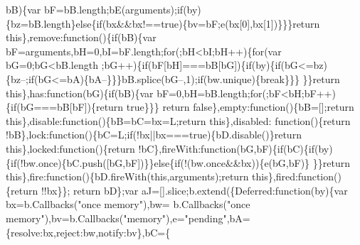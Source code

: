 \begin{DoxyCode}
      bB)\{var bF=bB.length;bE(arguments);\textcolor{keywordflow}{if}(by)\{bz=bB.length\}\textcolor{keywordflow}{else}\{\textcolor{keywordflow}{if}(bx&&bx!==\textcolor{keyword}{true})\{bv=bF;e(bx[0],bx[1])\}\}\}\textcolor{keywordflow}{return} \textcolor{keyword}{
      this}\},\textcolor{keyword}{remove}:\textcolor{keyword}{function}()\{\textcolor{keywordflow}{if}(bB)\{var bF=arguments,bH=0,bI=bF.length;\textcolor{keywordflow}{for}(;bH<bI;bH++)\{\textcolor{keywordflow}{for}(var bG=0;bG<bB.length
      ;bG++)\{\textcolor{keywordflow}{if}(bF[bH]===bB[bG])\{\textcolor{keywordflow}{if}(by)\{\textcolor{keywordflow}{if}(bG<=bz)\{bz--;\textcolor{keywordflow}{if}(bG<=bA)\{bA--\}\}\}bB.splice(bG--,1);\textcolor{keywordflow}{if}(bw.unique)\{\textcolor{keywordflow}{break}\}\}\}
      \}\}\textcolor{keywordflow}{return} \textcolor{keyword}{this}\},has:\textcolor{keyword}{function}(bG)\{\textcolor{keywordflow}{if}(bB)\{var bF=0,bH=bB.length;\textcolor{keywordflow}{for}(;bF<bH;bF++)\{\textcolor{keywordflow}{if}(bG===bB[bF])\{\textcolor{keywordflow}{return} \textcolor{keyword}{true}\}\}\}\textcolor{keywordflow}{
      return} \textcolor{keyword}{false}\},empty:\textcolor{keyword}{function}()\{bB=[];\textcolor{keywordflow}{return} \textcolor{keyword}{this}\},disable:\textcolor{keyword}{function}()\{bB=bC=bx=L;\textcolor{keywordflow}{return} \textcolor{keyword}{this}\},disabled:\textcolor{keyword}{
      function}()\{\textcolor{keywordflow}{return} !bB\},lock:\textcolor{keyword}{function}()\{bC=L;\textcolor{keywordflow}{if}(!bx||bx===\textcolor{keyword}{true})\{bD.disable()\}\textcolor{keywordflow}{return} \textcolor{keyword}{this}\},locked:\textcolor{keyword}{function}()\{\textcolor{keywordflow}{return} 
      !bC\},fireWith:\textcolor{keyword}{function}(bG,bF)\{\textcolor{keywordflow}{if}(bC)\{\textcolor{keywordflow}{if}(by)\{\textcolor{keywordflow}{if}(!bw.once)\{bC.push([bG,bF])\}\}\textcolor{keywordflow}{else}\{\textcolor{keywordflow}{if}(!(bw.once&&bx))\{e(bG,bF)\}
      \}\}\textcolor{keywordflow}{return} \textcolor{keyword}{this}\},fire:\textcolor{keyword}{function}()\{bD.fireWith(\textcolor{keyword}{this},arguments);\textcolor{keywordflow}{return} \textcolor{keyword}{this}\},fired:\textcolor{keyword}{function}()\{\textcolor{keywordflow}{return} !!bx\}\};\textcolor{keywordflow}{
      return} bD\};var aJ=[].slice;b.extend(\{Deferred:\textcolor{keyword}{function}(by)\{var bx=b.Callbacks(\textcolor{stringliteral}{"once memory"}),bw=
      b.Callbacks(\textcolor{stringliteral}{"once memory"}),bv=b.Callbacks(\textcolor{stringliteral}{"memory"}),e=\textcolor{stringliteral}{"pending"},bA=\{resolve:bx,reject:bw,notify:bv\},bC=\{

\end{DoxyCode}
